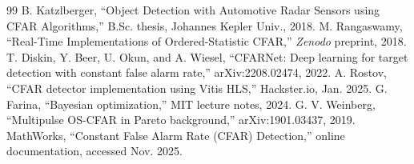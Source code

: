 \documentclass[10pt,letterpaper]{article}
\begin{document}
\begin{thebibliography}{99}
 B. Katzlberger, ``Object Detection with Automotive Radar Sensors using CFAR Algorithms,'' B.Sc. thesis, Johannes Kepler Univ., 2018.
 M. Rangaswamy, ``Real-Time Implementations of Ordered-Statistic CFAR,'' \emph{Zenodo} preprint, 2018.
 T. Diskin, Y. Beer, U. Okun, and A. Wiesel, ``CFARNet: Deep learning for target detection with constant false alarm rate,'' arXiv:2208.02474, 2022.
 A. Rostov, ``CFAR detector implementation using Vitis HLS,'' Hackster.io, Jan. 2025.
 G. Farina, ``Bayesian optimization,'' MIT lecture notes, 2024.
 G. V. Weinberg, ``Multipulse OS-CFAR in Pareto background,'' arXiv:1901.03437, 2019.
 MathWorks, ``Constant False Alarm Rate (CFAR) Detection,'' online documentation, accessed Nov. 2025.
\end{thebibliography}
\end{document}
